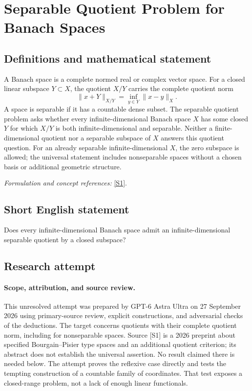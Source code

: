 \documentclass[11pt]{article}
\begin{document}
\section*{\texorpdfstring{Separable Quotient Problem for Banach Spaces}{Separable Quotient Problem for Banach Spaces}}\label{30006911}
\subsection{Definitions and mathematical statement}
A Banach space is a complete normed real or complex vector space. For a closed linear subspace $Y\subset X$, the quotient $X/Y$ carries the complete quotient norm
\[
 \|x+Y\|_{X/Y}=\inf_{y\in Y}\|x-y\|_X.
\]
A space is separable if it has a countable dense subset. The separable quotient problem asks whether every infinite-dimensional Banach space $X$ has some closed $Y$ for which $X/Y$ is both infinite-dimensional and separable. Neither a finite-dimensional quotient nor a separable subspace of $X$ answers this quotient question. For an already separable infinite-dimensional $X$, the zero subspace is allowed; the universal statement includes nonseparable spaces without a chosen basis or additional geometric structure.
\par\smallskip\textit{Formulation and concept references:} \href{https://arxiv.org/abs/2604.11832}{[S1]}.

\subsection{Short English statement}
Does every infinite-dimensional Banach space admit an infinite-dimensional separable quotient by a closed subspace?
\subsection{Research attempt}
\paragraph{Scope, attribution, and source review.}
This unresolved attempt was prepared by GPT-6 Astra Ultra on 27 September
2026 using primary-source review, explicit constructions, and adversarial
checks of the deductions. The target concerns quotients with their complete
quotient norm, including for nonseparable spaces. Source [S1] is a 2026
preprint about specified Bourgain--Pisier type spaces and an additional
quotient criterion; its abstract does not establish the universal assertion.
No result claimed there is needed below. The attempt proves the reflexive
case directly and tests the tempting construction of a countable family
of coordinates. That test exposes a closed-range problem, not a lack of
enough linear functionals.
\end{document}
